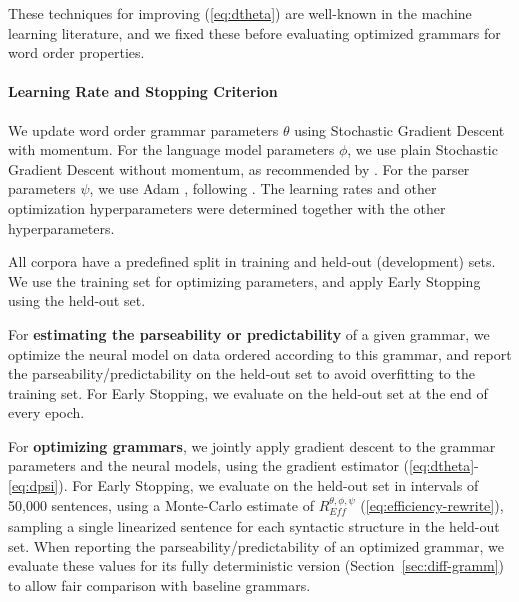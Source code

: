 \documentclass[10pt,twoside,lineno]{article}
\newcommand{\key}[1]{\textbf{#1}}
\begin{document}
These techniques for improving (\ref{eq:dtheta}) are well-known in the machine learning literature, and we fixed these before evaluating optimized grammars for word order properties.

\paragraph{Learning Rate and Stopping Criterion}
We update word order grammar parameters $\theta$ using Stochastic Gradient Descent with momentum.
For the language model parameters $\phi$, we use plain Stochastic Gradient Descent without momentum, as recommended by \citet{merity2018regularizing}. 
For the parser parameters $\psi$, we use Adam \citep{kingma2014adam}, following \citet{dozat2017stanford}.
The learning rates and other optimization hyperparameters were determined together with the other hyperparameters.

All corpora have a predefined split in training and held-out (development) sets.
We use the training set for optimizing parameters, and apply Early Stopping~\citep{prechelt1998early} using the held-out set.

For \key{estimating the parseability or predictability} of a given grammar, we optimize the neural model on data ordered according to this grammar, and report the parseability/predictability on the held-out set to avoid overfitting to the training set.
For Early Stopping, we evaluate on the held-out set at the end of every epoch. %

For \key{optimizing grammars}, we jointly apply gradient descent to the grammar parameters and the neural models, using the gradient estimator (\ref{eq:dtheta}-\ref{eq:dpsi}).
For Early Stopping, we evaluate on the held-out set in intervals of 50,000 sentences, using a Monte-Carlo estimate of $R_{\textit{Eff}}^{\theta, \phi, \psi}$ (\ref{eq:efficiency-rewrite}), sampling a single linearized sentence for each syntactic structure in the held-out set.
When reporting the parseability/predictability of an optimized grammar, we evaluate these values for its fully deterministic version (Section~\ref{sec:diff-gramm}) to allow fair comparison with baseline grammars.

\end{document}
